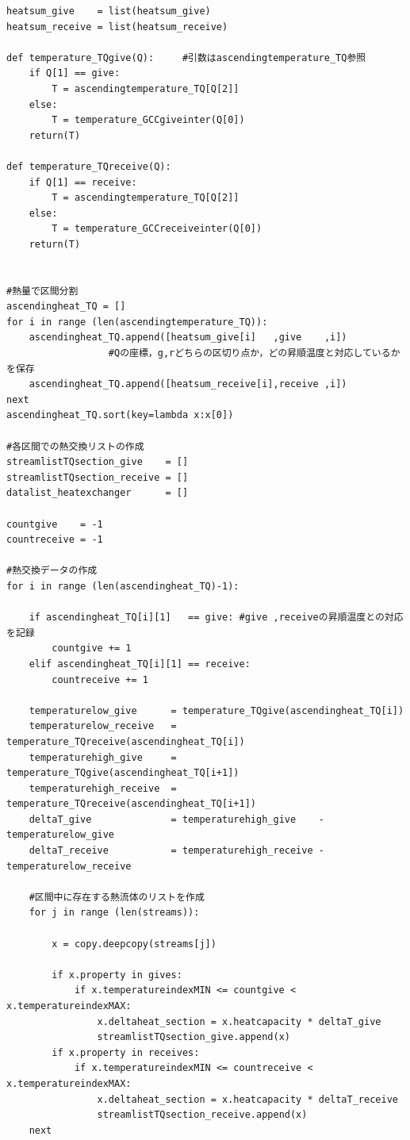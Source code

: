 \documentclass[a4j]{jsreport}
\begin{document}
\begin{lstlisting}[caption=グランドコンポジットカーブおよびTQ線図を書くコード]
heatsum_give    = list(heatsum_give)
heatsum_receive = list(heatsum_receive)

def temperature_TQgive(Q):     #引数はascendingtemperature_TQ参照
    if Q[1] == give:
        T = ascendingtemperature_TQ[Q[2]]
    else:
        T = temperature_GCCgiveinter(Q[0])
    return(T)

def temperature_TQreceive(Q):
    if Q[1] == receive:
        T = ascendingtemperature_TQ[Q[2]]
    else:
        T = temperature_GCCreceiveinter(Q[0])
    return(T)


#熱量で区間分割
ascendingheat_TQ = []
for i in range (len(ascendingtemperature_TQ)):
    ascendingheat_TQ.append([heatsum_give[i]   ,give    ,i])
                  #Qの座標，g,rどちらの区切り点か，どの昇順温度と対応しているかを保存
    ascendingheat_TQ.append([heatsum_receive[i],receive ,i])
next
ascendingheat_TQ.sort(key=lambda x:x[0])

#各区間での熱交換リストの作成
streamlistTQsection_give    = []
streamlistTQsection_receive = []
datalist_heatexchanger      = []

countgive    = -1
countreceive = -1

#熱交換データの作成
for i in range (len(ascendingheat_TQ)-1):

    if ascendingheat_TQ[i][1]   == give: #give ,receiveの昇順温度との対応を記録
        countgive += 1
    elif ascendingheat_TQ[i][1] == receive:
        countreceive += 1

    temperaturelow_give      = temperature_TQgive(ascendingheat_TQ[i])
    temperaturelow_receive   = temperature_TQreceive(ascendingheat_TQ[i])
    temperaturehigh_give     = temperature_TQgive(ascendingheat_TQ[i+1])
    temperaturehigh_receive  = temperature_TQreceive(ascendingheat_TQ[i+1])
    deltaT_give              = temperaturehigh_give    - temperaturelow_give
    deltaT_receive           = temperaturehigh_receive - temperaturelow_receive

    #区間中に存在する熱流体のリストを作成
    for j in range (len(streams)):

        x = copy.deepcopy(streams[j])

        if x.property in gives:
            if x.temperatureindexMIN <= countgive < x.temperatureindexMAX:
                x.deltaheat_section = x.heatcapacity * deltaT_give
                streamlistTQsection_give.append(x)
        if x.property in receives:
            if x.temperatureindexMIN <= countreceive < x.temperatureindexMAX:
                x.deltaheat_section = x.heatcapacity * deltaT_receive
                streamlistTQsection_receive.append(x)
    next


\end{lstlisting}
\end{document}
